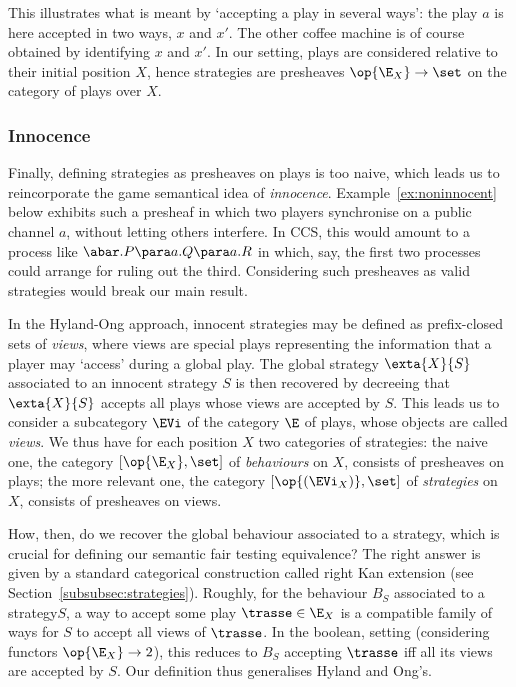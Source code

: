 \documentclass{LMCS}
\theoremstyle{plain}\newtheorem{satz}[thm]{Satz}
\renewcommand{\stratglobale}{behaviour\xspace}
\renewcommand{\stratglobales}{behaviours\xspace}
\renewcommand{\stratlocale}{strategy\xspace}
\renewcommand{\astratlocale}{a strategy\xspace}
\renewcommand{\stratlocales}{strategies\xspace}
\renewcommand{\plays}{\E}
\renewcommand{\views}{\EVi}
\begin{document}
This illustrates what is meant by `accepting a play in several ways':
the play $a$ is here accepted in two ways, $x$ and $x'$.  The other
coffee machine is of course obtained by identifying $x$ and $x'$. In
our setting, plays are considered relative to their initial position
$X$, hence strategies are presheaves $\op{\plays_X} \to \set$ on the
category of plays over $X$.

\subsubsection*{Innocence}
Finally, defining strategies as presheaves on plays is too naive,
which leads us to reincorporate the game semantical idea of
\emph{innocence}.  Example~\ref{ex:noninnocent} below exhibits such a
presheaf in which two players synchronise on a public channel $a$,
without letting others interfere. In CCS, this would amount to a
process like $\abar.P \para a.Q \para a.R$ in which, say, the first
two processes could arrange for ruling out the third.  Considering
such presheaves as valid strategies would break our main result.

In the Hyland-Ong approach, innocent strategies may be defined as
prefix-closed sets of \emph{views}, where views are special
plays representing the information that a player may `access' during
a global play. The global strategy $\exta{X}{S}$ associated to an
innocent strategy $S$ is then recovered by decreeing that
$\exta{X}{S}$ accepts all plays whose views are accepted by $S$.
This leads us to consider a subcategory $\views$ of the category
$\plays$ of plays, whose objects are called \emph{views}. We thus
have for each position $X$ two categories of strategies: the
naive one, the category $[\op{\plays_X},\set]$ of
\emph{\stratglobales} on $X$, consists of presheaves on plays; the
more relevant one, the category $[\op{(\views_X)},\set]$ of
\emph{\stratlocales} on $X$, consists of presheaves on views. 

How, then, do we recover the global \stratglobale associated to
\astratlocale, which is crucial for defining our semantic fair testing
equivalence?  The right answer is given by a standard categorical
construction called right Kan extension (see
Section~\ref{subsubsec:strategies}).  Roughly, for the \stratglobale
$B_S$ associated to a \stratlocale $S$, a way to accept some play
$\trasse \in \plays_X$ is a compatible family of ways for $S$ to
accept all views of $\trasse$.  In the boolean, setting (considering
functors $\op{\plays_X} \to 2$), this reduces to $B_S$ accepting
$\trasse$ iff all its views are accepted by $S$. Our definition thus
generalises Hyland and Ong's.
\end{document}
